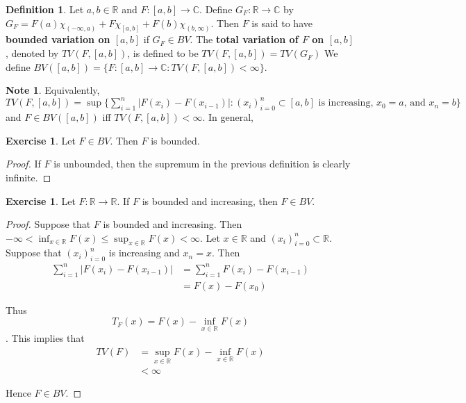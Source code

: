 \documentclass[12pt]{amsart}
\theoremstyle{definition}
\newtheorem{defn}[definition]{Definition}
\newtheorem{note}[definition]{Note}
\newtheorem{ex}[definition]{Exercise}
\newcommand{\C}{\mathbb{C}}
\newcommand{\R}{\mathbb{R}}
\newcommand{\lex}[1]{\label{ex:#1}}
\newcommand{\ld}[1]{\label{defn:#1}}
\begin{document}
	\begin{defn} \ld{00000} 
		Let $a,b \in \R$ and $F:[a,b] \rightarrow \C$. Define $G_F:\R \rightarrow \C$ by $G_F = F(a)\chi_{(-\infty,a)} + F\chi_{[a,b]}+F(b)\chi_{(b,\infty)}$. Then $F$ is said to have \textbf{bounded variation on $[a,b]$} if $G_F \in BV$. The \textbf{total variation of $F$ on $[a,b]$}, denoted by $TV(F, [a,b])$, is defined to be $TV(F, [a,b]) = TV(G_F)$ We define $BV([a,b]) = \{F:[a,b] \rightarrow \C: TV(F, [a,b]) < \infty\}$.
	\end{defn}
	
	\begin{note}
		Equivalently, $TV(F, [a,b]) = \sup \big \{\sum_{i=1}^{n}|F(x_{i}) - F(x_{i-1})|: (x_i)_{i=0}^n \subset [a,b] \text{ is increasing, } x_0=a \text{, and } x_n=b\big \}$ and $F \in BV([a,b])$ iff $TV(F, [a,b]) < \infty$. In general, 
	\end{note}
	
	\begin{ex} \lex{00000} 
		Let $F \in BV$. Then $F$ is bounded.
	\end{ex}
	
	\begin{proof}
		If $F$ is unbounded, then the supremum in the previous definition is clearly infinite.
	\end{proof}
	
	\begin{ex} \lex{00000} 
		Let $F:\R \rightarrow \R$. If $F$ is bounded and increasing, then $F \in BV$.
	\end{ex}
	
	\begin{proof}
		Suppose that $F$ is bounded and increasing. Then $-\infty<\inf_{x \in \R}F(x) \leq \sup_{x \in \R}F(x)<\infty$. Let $x \in \R$ and $(x_i)_{i=0}^n \subset \R$. Suppose that $(x_i)_{i=0}^n$ is increasing and $x_n=x$. Then 
		\begin{align*}
			\sum_{i=1}^n|F(x_i)-F(x_{i-1})| 
			&= \sum_{i=1}^n F(x_i)-F(x_{i-1})\\
			&= F(x)-F(x_0)
		\end{align*}
		
		Thus $$T_F(x) = F(x)-\inf_{x \in \R}F(x)$$. This implies that 
		\begin{align*}
			TV(F) 
			&= \sup_{x \in \R}F(x)-\inf_{x \in \R}F(x)\\
			&<\infty
		\end{align*}
		
		Hence $F \in BV$.
	\end{proof}
	
\end{document}
